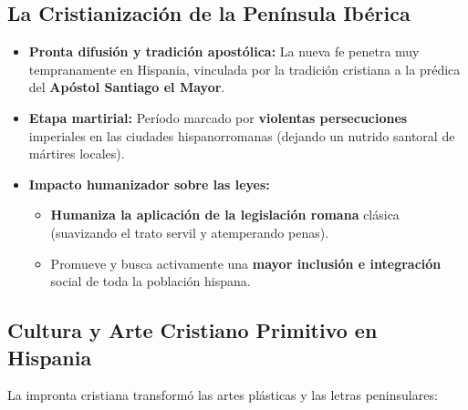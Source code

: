 \documentclass[11pt,letterpaper]{article}
\begin{document}
\subsection{La Cristianización de la Península Ibérica}
\begin{itemize}
  \item \textbf{Pronta difusión y tradición apostólica:} La nueva fe penetra muy tempranamente en Hispania, vinculada por la tradición cristiana a la prédica del \textbf{Apóstol Santiago el Mayor}.
  \item \textbf{Etapa martirial:} Período marcado por \textbf{violentas persecuciones} imperiales en las ciudades hispanorromanas (dejando un nutrido santoral de mártires locales).
  \item \textbf{Impacto humanizador sobre las leyes:}
  \begin{itemize}
    \item \textbf{Humaniza la aplicación de la legislación romana} clásica (suavizando el trato servil y atemperando penas).
    \item Promueve y busca activamente una \textbf{mayor inclusión e integración} social de toda la población hispana.
  \end{itemize}
\end{itemize}

\subsection{Cultura y Arte Cristiano Primitivo en Hispania}
La impronta cristiana transformó las artes plásticas y las letras peninsulares:
\end{document}

